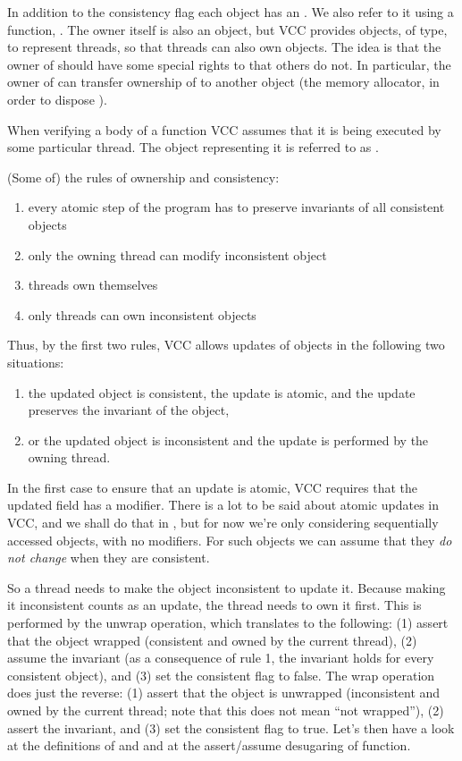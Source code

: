 In addition to the consistency flag each object has an .
We also refer to it using a function, .
The owner itself is also an object, but VCC provides objects, of \vcc{\thread} type, to represent threads,
so that threads can also own objects.
The idea is that the owner of  should have some special rights to  that others do not.
In particular, the owner of  can transfer ownership of  to
another object (\eg the memory allocator, in order to dispose ).

When verifying a body of a function VCC assumes that it is being executed by some
particular thread.
The \vcc{\thread} object representing it is referred to as \vcc{\me}.

(Some of) the rules of ownership and consistency:
\begin{enumerate}
\item every atomic step of the program has to preserve invariants of all consistent objects 
\item only the owning thread can modify inconsistent object
\item threads own themselves
\item only threads can own inconsistent objects
\end{enumerate}
Thus, by the first two rules, VCC allows updates of objects in the following two situations:
\begin{enumerate}
\item the updated object is consistent, the update is atomic, and the update preserves the invariant of the object,
\item or the updated object is inconsistent and the update is performed by the owning thread.
\end{enumerate}
In the first case to ensure that an update is atomic, VCC requires that the
updated field has a  modifier.
There is a lot to be said about atomic updates in VCC, and we shall do
that in , but for now we're only considering sequentially
accessed objects, with no  modifiers.
For such objects we can assume that they \emph{do not change}
when they are consistent.

So a thread needs to make the object inconsistent to update it.
Because making it inconsistent counts as an update, the thread needs
to own it first.
This is performed by the unwrap operation, which translates to the following:
(1) assert that the object wrapped (consistent and owned by the current thread), 
(2) assume the invariant (as a consequence of rule 1, the invariant holds for every consistent object),
and (3) set the consistent flag to false.
The wrap operation does just the reverse:
(1) assert that the object is unwrapped (inconsistent and owned by the current thread;
note that this does not mean ``not wrapped''),
(2) assert the invariant, 
and (3) set the consistent flag to true.
Let's then have a look at the definitions of  and %
and at the assert/assume desugaring of  function.


